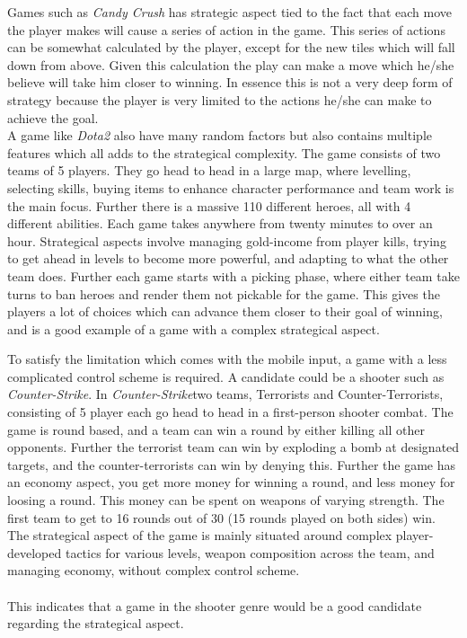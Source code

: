 Games such as \textit{Candy Crush}\cite{candycrush} has strategic aspect tied to the fact that each move the player makes will cause a series of action in the game.
This series of actions can be somewhat calculated by the player, except for the new tiles which will fall down from above.
Given this calculation the play can make a move which he/she believe will take him closer to winning.
In essence this is not a very deep form of strategy because the player is very limited to the actions he/she can make to achieve the goal.\\
A game like \textit{Dota2}\cite{Dota2} also have many random factors but also contains multiple features which all adds to the strategical complexity.
The game consists of two teams of 5 players. They go head to head in a large map, where levelling, selecting skills, buying items to enhance character performance and team work is the main focus. Further there is a massive 110 different heroes, all with 4 different abilities. Each game takes anywhere from twenty minutes to over an hour. 
Strategical aspects involve managing gold-income from player kills, trying to get ahead in levels to become more powerful, and adapting to what the other team does. Further each game starts with a picking phase, where either team take turns to ban heroes and render them not pickable for the game.   
This gives the players a lot of choices which can advance them closer to their goal of winning, and is a good example of a game with a complex strategical aspect.

To satisfy the limitation which comes with the mobile input, a game with a less complicated control scheme is required.
A candidate could be a shooter such as \textit{Counter-Strike}. \cite{counterstrike}
In \textit{Counter-Strike}two teams, Terrorists and Counter-Terrorists, consisting of 5 player each go head to head in a first-person shooter combat. The game is round based, and a team can win a round by either killing all other opponents. Further the terrorist team can win by exploding a bomb at designated targets, and the counter-terrorists can win by denying this. Further the game has an economy aspect, you get more money for winning a round, and less money for loosing a round. This money can be spent on weapons of varying strength. 
The first team to get to 16 rounds out of 30 (15 rounds played on both sides) win. 
The strategical aspect of the game is mainly situated around complex player-developed tactics for various levels, weapon composition across the team, and managing economy, without complex control scheme.\\\\
This indicates that a game in the shooter genre would be a good candidate regarding the strategical aspect.


